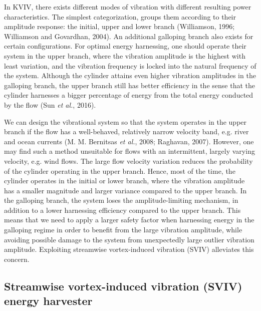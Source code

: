 \documentclass[]{article}
\begin{document}
In KVIV, there exists different modes of vibration with different
resulting power characteristics. The simplest categorization, groups
them according to their amplitude response: the initial, upper and lower
branch (Williamson, 1996; Williamson and Govardhan, 2004). An additional
galloping branch also exists for certain configurations. For optimal
energy harnessing, one should operate their system in the upper branch,
where the vibration amplitude is the highest with least variation, and
the vibration frequency is locked into the natural frequency of the
system. Although the cylinder attains even higher vibration amplitudes
in the galloping branch, the upper branch still has better efficiency in
the sense that the cylinder harnesses a bigger percentage of energy from
the total energy conducted by the flow (Sun \emph{et al.}, 2016).

We can design the vibrational system so that the system operates in the
upper branch if the flow has a well-behaved, relatively narrow velocity
band, e.g. river and ocean currents (M. M. Bernitsas \emph{et al.},
2008; Raghavan, 2007). However, one may find such a method unsuitable
for flows with an intermittent, largely varying velocity, e.g. wind
flows. The large flow velocity variation reduces the probability of the
cylinder operating in the upper branch. Hence, most of the time, the
cylinder operates in the initial or lower branch, where the vibration
amplitude has a smaller magnitude and larger variance compared to the
upper branch. In the galloping branch, the system loses the
amplitude-limiting mechanism, in addition to a lower harnessing
efficiency compared to the upper branch. This means that we need to
apply a larger safety factor when harnessing energy in the galloping
regime in order to benefit from the large vibration amplitude, while
avoiding possible damage to the system from unexpectedly large outlier
vibration amplitude. Exploiting streamwise vortex-induced vibration
(SVIV) alleviates this concern.

\subsection{\texorpdfstring{\protect\hypertarget{_Ref40969711}{}{\protect\hypertarget{_Ref40969718}{}{\protect\hypertarget{_Toc41048800}{}{}}}Streamwise
vortex-induced vibration (SVIV) energy
harvester}{Streamwise vortex-induced vibration (SVIV) energy harvester}}\label{streamwise-vortex-induced-vibration-sviv-energy-harvester}
\end{document}
